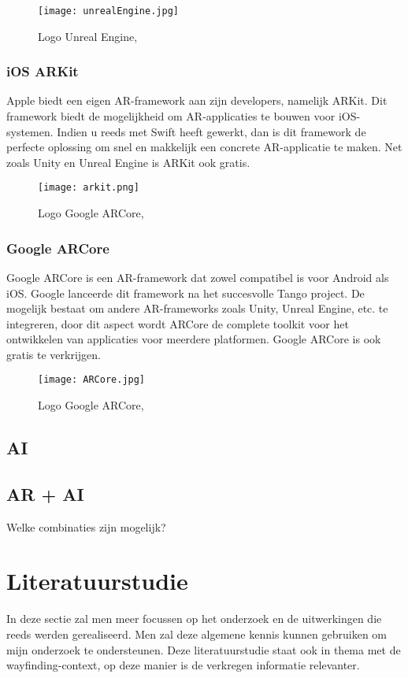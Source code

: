 \begin{figure}[H]
	\centering
	\texttt{[image: unrealEngine.jpg]}
	\caption{Logo Unreal Engine, \autocite{UnrealEngine2019}}
\end{figure}

\subsubsection{iOS ARKit}
Apple biedt een eigen AR-framework aan zijn developers, namelijk ARKit. Dit framework biedt de mogelijkheid om AR-applicaties te bouwen voor iOS-systemen. Indien u reeds met Swift heeft gewerkt, dan is dit framework de perfecte oplossing om snel en makkelijk een concrete AR-applicatie te maken. Net zoals Unity en Unreal Engine is ARKit ook gratis.
\begin{figure}[H]
	\centering
	\texttt{[image: arkit.png]}
	\caption{Logo Google ARCore, \autocite{Apple2019}}
\end{figure}

\subsubsection{Google ARCore}
Google ARCore is een AR-framework dat zowel compatibel is voor Android als iOS. Google lanceerde dit framework na het succesvolle Tango project.
De mogelijk bestaat om andere AR-frameworks zoals Unity, Unreal Engine, etc.  te integreren, door dit aspect wordt ARCore de complete toolkit voor het ontwikkelen van applicaties voor meerdere platformen. Google ARCore is ook gratis te verkrijgen.

\begin{figure}[H]
	\centering
	\texttt{[image: ARCore.jpg]}
	\caption{Logo Google ARCore, \autocite{ARCore2019}}
\end{figure}
\subsection{AI}


\subsection{AR + AI}
Welke combinaties zijn mogelijk?
\newpage
\section{Literatuurstudie}

In deze sectie zal men meer focussen op het onderzoek en de uitwerkingen die reeds werden gerealiseerd. Men zal deze algemene kennis kunnen gebruiken om mijn onderzoek te ondersteunen. Deze literatuurstudie staat ook in thema met de wayfinding-context, op deze manier is de verkregen informatie relevanter.

